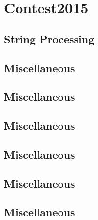 \section{Contest2015}
\subsection{String Processing}
\raggedbottom
\vspace{-.7\baselineskip}\hrulefill
\vspace{0.1\baselineskip}\subsection{Miscellaneous}
\raggedbottom
\vspace{-.7\baselineskip}\hrulefill
\vspace{0.1\baselineskip}\subsection{Miscellaneous}
\raggedbottom
\vspace{-.7\baselineskip}\hrulefill
\vspace{0.1\baselineskip}\subsection{Miscellaneous}
\raggedbottom
\vspace{-.7\baselineskip}\hrulefill
\vspace{0.1\baselineskip}\subsection{Miscellaneous}
\raggedbottom
\vspace{-.7\baselineskip}\hrulefill
\vspace{0.1\baselineskip}\subsection{Miscellaneous}
\raggedbottom
\vspace{-.7\baselineskip}\hrulefill
\vspace{0.1\baselineskip}\subsection{Miscellaneous}
\raggedbottom
\vspace{-.7\baselineskip}\hrulefill
\vspace{0.1\baselineskip}

